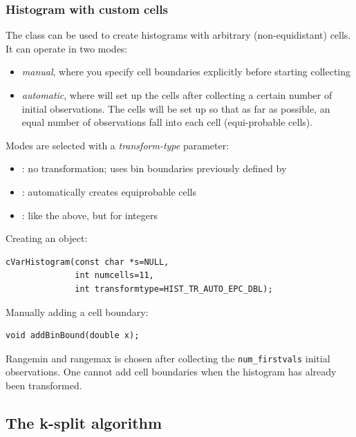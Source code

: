 \subsubsection{Histogram with custom cells}


The  class can be used to create
histograms with arbitrary (non-equidistant) cells.
It can operate in two modes:

\begin{itemize}
  \item \textit{manual}, where you specify cell boundaries explicitly
     before starting collecting
  \item \textit{automatic}, where  will set up the cells
     after collecting a certain number of initial observations. The cells
     will be set up so that as far as possible, an equal number of observations
     fall into each cell (equi-probable cells).
\end{itemize}

Modes are selected with a \textit{transform-type} parameter:
\begin{itemize}
  \item{: no transformation; uses bin boundaries
    previously defined by }
  \item{: automatically creates equiprobable cells}
  \item{: like the above, but for integers}
\end{itemize}

Creating an object:

\begin{verbatim}
cVarHistogram(const char *s=NULL,
              int numcells=11,
              int transformtype=HIST_TR_AUTO_EPC_DBL);
\end{verbatim}

Manually adding a cell boundary:

\begin{verbatim}
void addBinBound(double x);
\end{verbatim}

Rangemin and rangemax is chosen after collecting the
\texttt{num\_firstvals} initial observations. One cannot add cell
boundaries when the histogram has already been transformed.





\subsection{The k-split algorithm}

